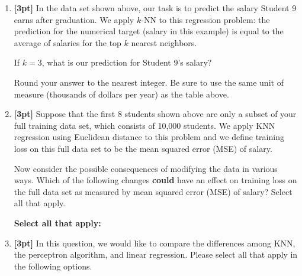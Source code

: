 \documentclass[12pt]{article}
\begin{document}
\begin{enumerate}
 
    
    
    \item \textbf{[3pt]} In the data set shown above, our task is to predict the salary Student 9 earns after graduation. We apply $k$-NN to this regression problem: the prediction for the numerical target (salary in this example) is equal to the average of salaries for the top $k$ nearest neighbors. 
    
    If $k=3$, what is our prediction for Student 9's salary?
    
    Round your answer to the nearest integer. Be sure to use the same unit of measure (thousands of dollars per year) as the table above.
    
    \begin{tcolorbox}[fit,height=1cm, width=4cm, blank, borderline={1pt}{-2pt},nobeforeafter]
    \end{tcolorbox}
    
    

    \item \textbf{[3pt]} Suppose that the first 8 students shown above are only a subset of your full training data set, which consists of 10,000 students. We apply KNN regression using Euclidean distance to this problem and we define training loss on this full data set to be the mean squared error (MSE) of salary.

    Now consider the possible consequences of modifying the data in various ways. Which of the following changes \textbf{could} have an effect on training loss on the full data set as measured by mean squared error (MSE) of salary? Select all that apply.
    
    
        
    \textbf{Select all that apply:}

    
    
    \item \textbf{[3pt]} In this question, we would like to compare the differences among KNN, the perceptron algorithm, and linear regression. Please select all that apply in the following options.
    

\end{enumerate}
\end{document}
